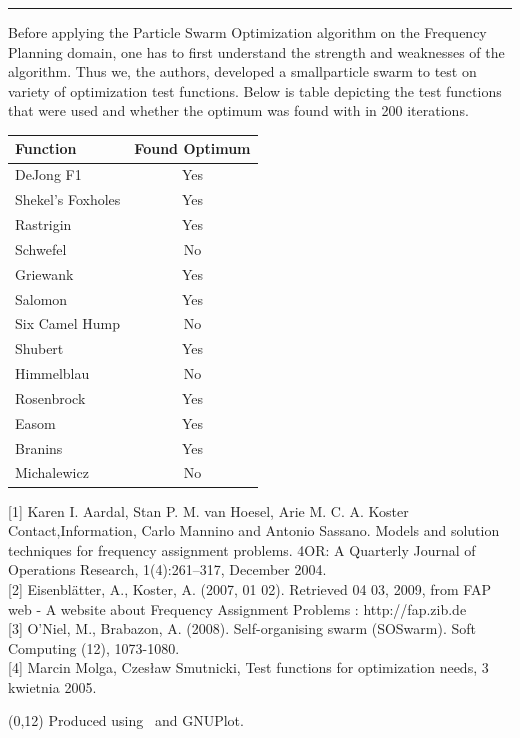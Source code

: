 \documentclass[portrait, a0]{a0poster}
\def\Heading#1{\noindent{\hfill{\LARGE{\color{BurntOrange} \bf #1}}}\medskip\hrule}
\def\SHeading#1{\medskip\par\noindent{\Large\color{BurntOrange} \it #1}\medskip}
\begin{document}
\begin{textblock}{8}
\Heading{Results}

Before applying the Particle Swarm Optimization algorithm on the Frequency Planning domain, one has to first understand the strength and weaknesses of the algorithm. Thus we, the authors, developed a smallparticle swarm to test on variety of optimization test functions. Below is table depicting the test functions that were used and whether the optimum was found with in 200 iterations.

\begin{center}
\begin{tabular}{| l | c |}
	\hline
	\textbf{Function} & \textbf{Found Optimum} \\
	\hline
	DeJong F1 & Yes \\
	\hline
	Shekel's Foxholes & Yes \\
	\hline
	Rastrigin & Yes \\
	\hline
	Schwefel & No \\
	\hline
	Griewank & Yes \\
	\hline
	Salomon & Yes \\
	\hline
	Six Camel Hump & No \\
	\hline
	Shubert & Yes \\
	\hline
	Himmelblau & No \\
	\hline
	Rosenbrock & Yes \\
	\hline
	Easom & Yes \\
	\hline
	Branins & Yes \\
	\hline
	Michalewicz & No \\
	\hline
\end{tabular}
\end{center}

\SHeading{References}

{[1]} Karen I. Aardal, Stan P. M. van Hoesel, Arie M. C. A. Koster Contact,Information, Carlo Mannino and Antonio Sassano. Models and solution techniques for frequency assignment problems. 4OR: A Quarterly Journal of Operations Research, 1(4):261–317, December 2004.\\
{[2]} Eisenblätter, A., Koster, A. (2007, 01 02). Retrieved 04 03, 2009, from FAP web - A website about Frequency Assignment Problems : http://fap.zib.de\\
{[3]} O'Niel, M., Brabazon, A. (2008). Self-organising swarm (SOSwarm). Soft Computing (12), 1073-1080.\\
{[4]} Marcin Molga, Czesław Smutnicki, Test functions for optimization needs, 3 kwietnia 2005.

\end{textblock}

\begin{textblock}{8}(0,12)
\footnotesize
Produced using \LaTeXe\ and GNUPlot.
\end{textblock}
\end{document}
